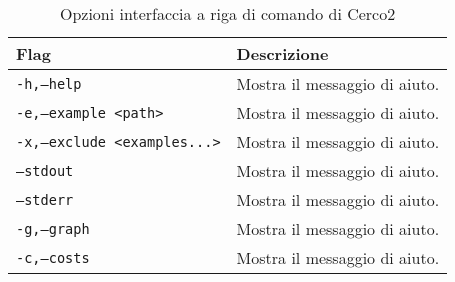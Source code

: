 \documentclass[12pt,a4paper,openright,oneside]{report}
\theoremstyle{definition}
\begin{document}
\begin{table}[h!]
\centering
\begin{tabular}{ |m{10em}|m{20em}| }
    \hline
    \textbf{Flag} & \textbf{Descrizione}\\
    \hline
    \texttt{-h,--help} & Mostra il messaggio di aiuto.\\
    \hline
    \texttt{-e,--example <path>} & Mostra il messaggio di aiuto.\\
    \hline
    \texttt{-x,--exclude <examples...>} & Mostra il messaggio di aiuto.\\
    \hline
    \texttt{--stdout} & Mostra il messaggio di aiuto.\\
    \hline
    \texttt{--stderr} & Mostra il messaggio di aiuto.\\
    \hline
    \texttt{-g,--graph} & Mostra il messaggio di aiuto.\\
    \hline
    \texttt{-c,--costs} & Mostra il messaggio di aiuto.\\
    \hline
\end{tabular}
\caption{Opzioni interfaccia a riga di comando di Cerco2}
\label{table:cerco2:options}
\end{table}
\end{document}
